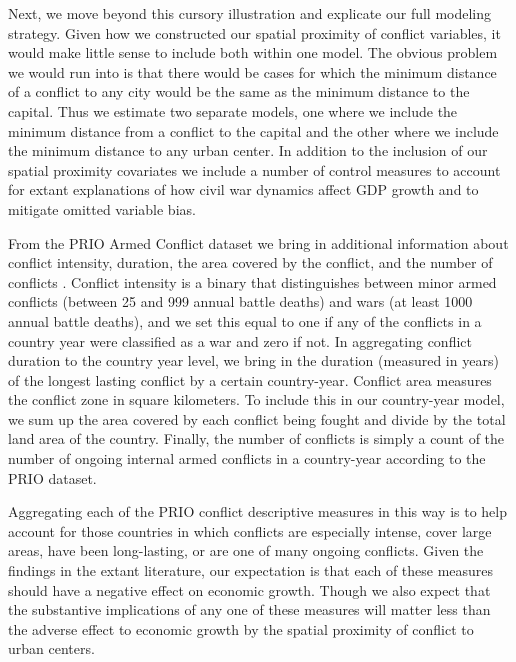 Next, we move beyond this cursory illustration and explicate our full modeling strategy. Given how we constructed our spatial proximity of conflict variables, it would make little sense to include both within one model. The obvious problem we would run into is that there would be cases for which the minimum distance of a conflict to any city would be the same as the minimum distance to the capital. Thus we estimate two separate models, one where we include the minimum distance from a conflict to the capital and the other where we include the minimum distance to any urban center. In addition to the inclusion of our spatial proximity covariates we include a number of control measures to account for extant explanations of how civil war dynamics affect GDP growth and to mitigate omitted variable bias. 

From the PRIO Armed Conflict dataset we bring in additional information about conflict intensity, duration, the area covered by the conflict, and the number of conflicts \citep{themner:wallensteen:2014}. Conflict intensity is a binary that distinguishes between minor armed conflicts (between 25 and 999 annual battle deaths) and wars (at least 1000 annual battle deaths), and we set this equal to one if any of the conflicts in a country year were classified as a war and zero if not. In aggregating conflict duration to the country year level, we bring in the duration (measured in years) of the longest lasting conflict by a certain country-year. Conflict area measures the conflict zone in square kilometers. To include this in our country-year model, we sum up the area covered by each conflict being fought and divide by the total land area of the country. Finally, the number of conflicts is simply a count of the number of ongoing internal armed conflicts in a country-year according to the PRIO dataset.


Aggregating each of the PRIO conflict descriptive measures in this way is to help account for those countries in which conflicts are especially intense, cover large areas, have been long-lasting, or are one of many ongoing conflicts. Given the findings in the extant literature, our expectation is that each of these measures should have a negative effect on economic growth. Though we also expect that the substantive implications of any one of these measures will matter less than the adverse effect to economic growth by the spatial proximity of conflict to urban centers.

